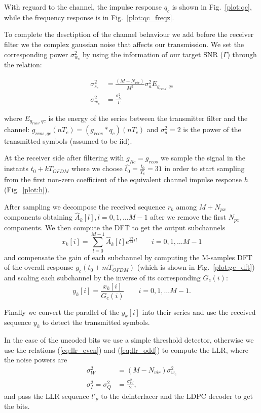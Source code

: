 \documentclass[a4paper,oneside]{article}
\begin{document}
With reguard to the channel, the impulse response $q_c$ is shown in Fig.~\ref{plot:qc}, while the frequency response is in Fig.~\ref{plot:qc_freqz}.

To complete the desctiption of the channel behaviour we add before the receiver filter we the complex gaussian noise that affects our transmission. We set the corresponding power $\sigma_{w_c}^2$ by using the information of our target SNR ($\Gamma$) through the relation:

\begin{align}
  \sigma^2_{s_c} &= \frac{(M-N_{vir})}{M^2}\sigma_{a}^2 E_{g_{rcos},qc} \\
\sigma_{w_c}^2 &= \frac{\sigma^2_{s_c}}{\Gamma}
\label{eq:var_OFDM}
\end{align}

where $E_{g_{rcos},qc}$ is the energy of the series between the transmitter filter and the channel: $g_{rcos,qc}(nT_c) = \left(g_{rcos}*q_c\right)(nT_c)$ and $\sigma_a^2 = 2$ is the power of the transmitted symbols (assumed to be iid).

At the receiver side after filtering with $g_{Rc} = g_{rcos}$ we sample the signal in the instants $t_0 + kT_{OFDM}$ where we choose $\hat{t_0} = \frac{t_0}{T_c} = 31$ in order to start sampling from the first non-zero coefficient of the equivalent channel impulse response $h$ (Fig.~\ref{plot:h}).

After sampling we decompose the received sequence $r_k$ among $M+N_{px}$ components obtaining $\hat{A}_k[l], l = 0,1,\dots M-1$ after we remove the first $N_{px}$ components. We then compute the DFT to get the output subchannels
\begin{equation}
  x_k[i] = \sum_{l=0}^{M-1}\hat{A}_k[l]e^{\frac{2\pi}{M}il} \qquad i=0,1,\dots M-1
\end{equation}
and compensate the gain of each subchannel by computing the M-samples
DFT of the overall response $g_c(t_0 + mT_{OFDM})$ (which is shown in
Fig.~\ref{plot:gc_dft}) and scaling each subchannel by the inverse of
its corresponding $G_c(i)$:
\begin{equation}
  y_k[i] = \frac{x_k[i]}{G_c(i)} \qquad i=0,1,\dots M-1 .
\end{equation}

Finally we convert the parallel of the $y_k[i]$ into their series and use the received sequence $y_k$ to detect the transmitted symbols.

In the case of the uncoded bits we use a simple threshold detector,
otherwise we use the relations (\ref{eq:llr_even}) and
(\ref{eq:llr_odd}) to compute the LLR, where the noise powers are
\begin{align}
  \sigma_W^2 &= (M-N_{vir})\sigma^2_{w_c} \\
  \sigma^2_I = \sigma^2_Q &= \frac{\sigma_W^2}{2} ,
\end{align}
and pass the LLR sequence $l'_p$ to the deinterlacer and the LDPC
decoder to get the bits.
\end{document}
